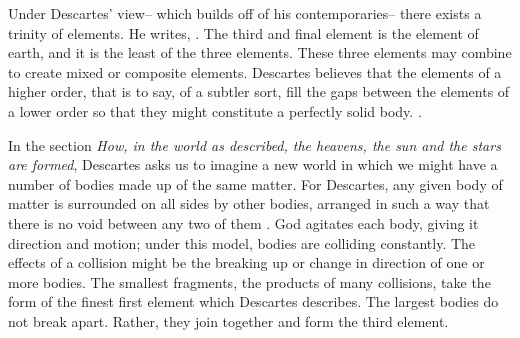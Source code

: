 \documentclass[12pt,twoside]{reedthesis}
\begin{document}
    Under Descartes' view-- which builds off of his contemporaries-- there exists a trinity of elements. He writes, \cite[p.~17]{descartes}. The third and final element is the element of earth, and it is the least  of the three elements. These three elements may combine to create mixed or composite elements. Descartes believes that the elements of a higher order, that is to say, of a subtler sort, fill the gaps between the elements of a lower order so that they might constitute a perfectly solid body.  \cite[p.~17]{descartes}. \par 






    In the section \emph{How, in the world as described, the heavens, the sun and the stars are formed}, Descartes asks us to imagine a new world in which we might have a number of bodies made up of the same matter. For Descartes, any given body of matter is surrounded on all sides by other bodies, arranged in such a way that there is no void between any two of them \citep[p.~25]{descartes}. God agitates each body, giving it direction and motion; under this model, bodies are colliding constantly. The effects of a collision might be the breaking up or change in direction of one or more bodies. The smallest fragments, the products of many collisions, take the form of the finest first element which Descartes describes. The largest bodies do not break apart. Rather, they join together and form the third element. \par
\end{document}
